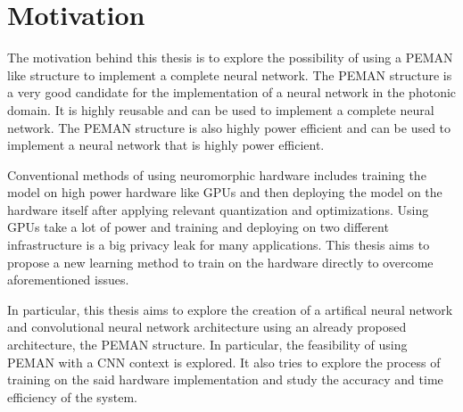 \section{Motivation}

The motivation behind this thesis is to explore the possibility of using a PEMAN like structure to implement a complete neural network. The PEMAN structure is a very good candidate for the implementation of a neural network in the photonic domain. It is highly reusable and can be used to implement a complete neural network. The PEMAN structure is also highly power efficient and can be used to implement a neural network that is highly power efficient.

Conventional methods of using neuromorphic hardware includes training the model on high power hardware like GPUs and then deploying the model on the hardware itself after applying relevant quantization and optimizations. Using GPUs take a lot of power and training and deploying on two different infrastructure is a big privacy leak for many applications. This thesis aims to propose a new learning method to train on the hardware directly to overcome aforementioned issues.

In particular, this thesis aims to explore the creation of a artifical neural network and convolutional neural network architecture using an already proposed architecture, the PEMAN structure. In particular, the feasibility of using PEMAN with a CNN context is explored. It also tries to explore the process of training on the said hardware implementation and study the accuracy and time efficiency of the system.
